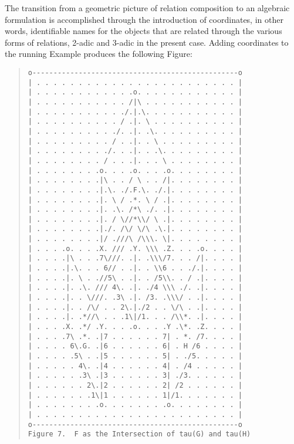 \documentclass[12pt]{article}
\begin{document}

The transition from a geometric picture of relation composition to an algebraic formulation is accomplished through the introduction of coordinates, in other words, identifiable names for the objects that are related through the various forms of relations, 2-adic and 3-adic in the present case.  Adding coordinates to the running Example produces the following Figure:

\begin{quote}\begin{verbatim}
o-------------------------------------------------o
| . . . . . . . . . . . . . . . . . . . . . . . . |
| . . . . . . . . . . . .o. . . . . . . . . . . . |
| . . . . . . . . . . . /|\ . . . . . . . . . . . |
| . . . . . . . . . . ./.|.\. . . . . . . . . . . |
| . . . . . . . . . . / .|. \ . . . . . . . . . . |
| . . . . . . . . . ./. .|. .\. . . . . . . . . . |
| . . . . . . . . . / . .|. . \ . . . . . . . . . |
| . . . . . . . . ./. . .|. . .\. . . . . . . . . |
| . . . . . . . . / . . .|. . . \ . . . . . . . . |
| . . . . . . . .o. . . .o. . . .o. . . . . . . . |
| . . . . . . . .|\ . . / \ . . /|. . . . . . . . |
| . . . . . . . .|.\. ./.F.\. ./.|. . . . . . . . |
| . . . . . . . .|. \ / .*. \ / .|. . . . . . . . |
| . . . . . . . .|. .\. /*\ ./. .|. . . . . . . . |
| . . . . . . . .|. / \//*\\/ \ .|. . . . . . . . |
| . . . . . . . .|./. /\/ \/\ .\.|. . . . . . . . |
| . . . . . . . .|/ .///\ /\\\. \|. . . . . . . . |
| . . . .o. . . .X. /// .Y. \\\ .Z. . . .o. . . . |
| . . . .|\ . . .7\///. .|. .\\\/7. . . /|. . . . |
| . . . .|.\. . . 6// . .|. . \\6 . . ./.|. . . . |
| . . . .|. \ . .//5\ . .|. . /5\\. . / .|. . . . |
| . . . .|. .\. /// 4\. .|. ./4 \\\ ./. .|. . . . |
| . . . .|. . \///. .3\ .|. /3. .\\\/ . .|. . . . |
| . . . .|. . /\/ . . 2\.|./2 . . \/\ . .|. . . . |
| . . . .|. .*//\ . . .1\|/1. . . /\\*. .|. . . . |
| . . . .X. .*/ .Y. . . .o. . . .Y .\*. .Z. . . . |
| . . . .7\ .*. .|7 . . . . . . 7| . *. /7. . . . |
| . . . . 6\.G. .|6 . . . . . . 6| . H /6 . . . . |
| . . . . .5\ . .|5 . . . . . . 5| . ./5. . . . . |
| . . . . . 4\. .|4 . . . . . . 4| . /4 . . . . . |
| . . . . . .3\ .|3 . . . . . . 3| ./3. . . . . . |
| . . . . . . 2\.|2 . . . . . . 2| /2 . . . . . . |
| . . . . . . .1\|1 . . . . . . 1|/1. . . . . . . |
| . . . . . . . .o. . . . . . . .o. . . . . . . . |
| . . . . . . . . . . . . . . . . . . . . . . . . |
o-------------------------------------------------o
Figure 7.  F as the Intersection of tau(G) and tau(H)
\end{verbatim}\end{quote}
\end{document}
